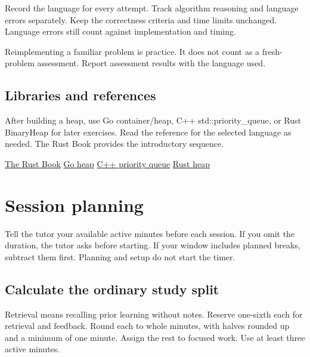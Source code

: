 \documentclass[11pt,letterpaper]{article}
\begin{document}
Record the language for every attempt. Track algorithm reasoning and language errors separately. Keep the correctness criteria and time limits unchanged. Language errors still count against implementation and timing.

Reimplementing a familiar problem is practice. It does not count as a fresh-problem assessment. Report assessment results with the language used.

\subsection*{Libraries and references}

After building a heap, use Go container/heap, C++ std::priority\_queue, or Rust BinaryHeap for later exercises. Read the reference for the selected language as needed. The Rust Book provides the introductory sequence.

\href{https://doc.rust-lang.org/book/}{The Rust Book} \href{https://pkg.go.dev/container/heap}{Go heap} \href{https://eel.is/c++draft/priority.queue}{C++ priority queue} \href{https://doc.rust-lang.org/std/collections/struct.BinaryHeap.html}{Rust heap}

\section{Session planning}\label{sec:25}

Tell the tutor your available active minutes before each session. If you omit the duration, the tutor asks before starting. If your window includes planned breaks, subtract them first. Planning and setup do not start the timer.

\subsection*{Calculate the ordinary study split}

Retrieval means recalling prior learning without notes. Reserve one-sixth each for retrieval and feedback. Round each to whole minutes, with halves rounded up and a minimum of one minute. Assign the rest to focused work. Use at least three active minutes.
\end{document}
